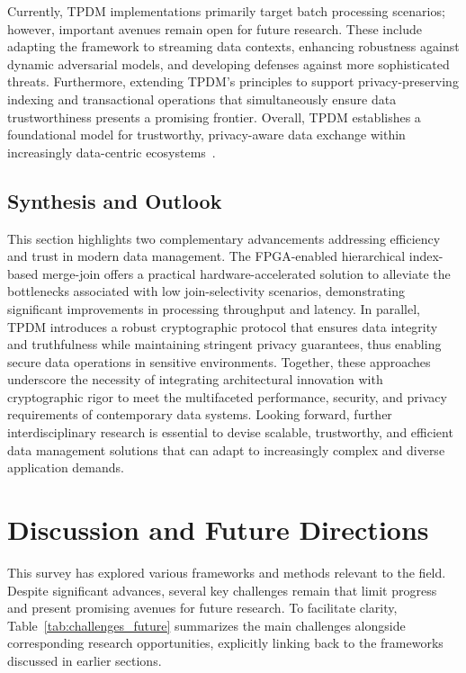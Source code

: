 \documentclass[sigconf]{acmart}
\begin{document}
Currently, TPDM implementations primarily target batch processing scenarios; however, important avenues remain open for future research. These include adapting the framework to streaming data contexts, enhancing robustness against dynamic adversarial models, and developing defenses against more sophisticated threats. Furthermore, extending TPDM’s principles to support privacy-preserving indexing and transactional operations that simultaneously ensure data trustworthiness presents a promising frontier. Overall, TPDM establishes a foundational model for trustworthy, privacy-aware data exchange within increasingly data-centric ecosystems~\cite{ref25}.

\subsection{Synthesis and Outlook}

This section highlights two complementary advancements addressing efficiency and trust in modern data management. The FPGA-enabled hierarchical index-based merge-join offers a practical hardware-accelerated solution to alleviate the bottlenecks associated with low join-selectivity scenarios, demonstrating significant improvements in processing throughput and latency. In parallel, TPDM introduces a robust cryptographic protocol that ensures data integrity and truthfulness while maintaining stringent privacy guarantees, thus enabling secure data operations in sensitive environments. Together, these approaches underscore the necessity of integrating architectural innovation with cryptographic rigor to meet the multifaceted performance, security, and privacy requirements of contemporary data systems. Looking forward, further interdisciplinary research is essential to devise scalable, trustworthy, and efficient data management solutions that can adapt to increasingly complex and diverse application demands.

\section{Discussion and Future Directions}

This survey has explored various frameworks and methods relevant to the field. Despite significant advances, several key challenges remain that limit progress and present promising avenues for future research. To facilitate clarity, Table~\ref{tab:challenges_future} summarizes the main challenges alongside corresponding research opportunities, explicitly linking back to the frameworks discussed in earlier sections.
\end{document}
